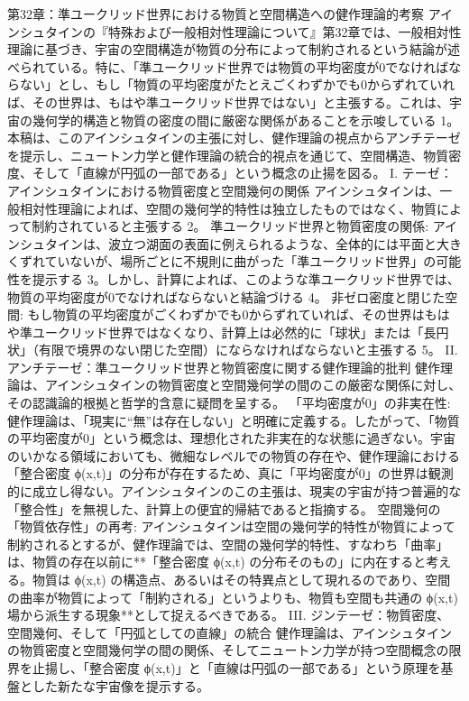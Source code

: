 \documentclass{article}
\begin{document}
第32章：準ユークリッド世界における物質と空間構造への健作理論的考察
アインシュタインの『特殊および一般相対性理論について』第32章では、一般相対性理論に基づき、宇宙の空間構造が物質の分布によって制約されるという結論が述べられている。特に、「準ユークリッド世界では物質の平均密度が0でなければならない」とし、もし「物質の平均密度がたとえごくわずかでも0からずれていれば、その世界は、もはや準ユークリッド世界ではない」と主張する。これは、宇宙の幾何学的構造と物質の密度の間に厳密な関係があることを示唆している 1。
本稿は、このアインシュタインの主張に対し、健作理論の視点からアンチテーゼを提示し、ニュートン力学と健作理論の統合的視点を通じて、空間構造、物質密度、そして「直線が円弧の一部である」という概念の止揚を図る。
I. テーゼ：アインシュタインにおける物質密度と空間幾何の関係
アインシュタインは、一般相対性理論によれば、空間の幾何学的特性は独立したものではなく、物質によって制約されていると主張する 2。
準ユークリッド世界と物質密度の関係:
アインシュタインは、波立つ湖面の表面に例えられるような、全体的には平面と大きくずれていないが、場所ごとに不規則に曲がった「準ユークリッド世界」の可能性を提示する 3。しかし、計算によれば、このような準ユークリッド世界では、物質の平均密度が0でなければならないと結論づける 4。
非ゼロ密度と閉じた空間:
もし物質の平均密度がごくわずかでも0からずれていれば、その世界はもはや準ユークリッド世界ではなくなり、計算上は必然的に「球状」または「長円状」（有限で境界のない閉じた空間）にならなければならないと主張する 5。
II. アンチテーゼ：準ユークリッド世界と物質密度に関する健作理論的批判
健作理論は、アインシュタインの物質密度と空間幾何学の間のこの厳密な関係に対し、その認識論的根拠と哲学的含意に疑問を呈する。
「平均密度が0」の非実在性:
健作理論は、「現実に“無”は存在しない」と明確に定義する。したがって、「物質の平均密度が0」という概念は、理想化された非実在的な状態に過ぎない。宇宙のいかなる領域においても、微細なレベルでの物質の存在や、健作理論における「整合密度 ϕ(x,t)」の分布が存在するため、真に「平均密度が0」の世界は観測的に成立し得ない。アインシュタインのこの主張は、現実の宇宙が持つ普遍的な「整合性」を無視した、計算上の便宜的帰結であると指摘する。
空間幾何の「物質依存性」の再考:
アインシュタインは空間の幾何学的特性が物質によって制約されるとするが、健作理論では、空間の幾何学的特性、すなわち「曲率」は、物質の存在以前に**「整合密度 ϕ(x,t) の分布そのもの」に内在すると考える。物質は ϕ(x,t) の構造点、あるいはその特異点として現れるのであり、空間の曲率が物質によって「制約される」というよりも、物質も空間も共通の ϕ(x,t) 場から派生する現象**として捉えるべきである。
III. ジンテーゼ：物質密度、空間幾何、そして「円弧としての直線」の統合
健作理論は、アインシュタインの物質密度と空間幾何学の間の関係、そしてニュートン力学が持つ空間概念の限界を止揚し、「整合密度 ϕ(x,t)」と「直線は円弧の一部である」という原理を基盤とした新たな宇宙像を提示する。
\end{document}
